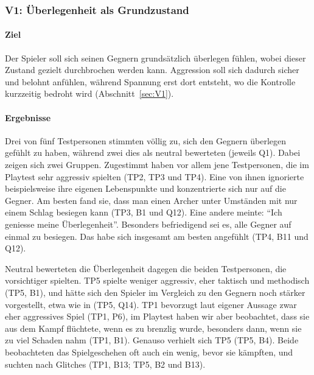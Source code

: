 \documentclass[../Main.tex]{subfiles}
\begin{document}
\subsubsection{V1: Überlegenheit als Grundzustand}

\paragraph{Ziel}
Der Spieler soll sich seinen Gegnern grundsätzlich überlegen fühlen, wobei dieser Zustand gezielt durchbrochen werden kann. Aggression soll sich dadurch sicher und belohnt anfühlen, während Spannung erst dort entsteht, wo die Kontrolle kurzzeitig bedroht wird (Abschnitt~\ref{sec:V1}).

\paragraph{Ergebnisse}
Drei von fünf Testpersonen stimmten völlig zu, sich den Gegnern überlegen gefühlt zu haben, während zwei dies als neutral bewerteten (jeweils Q1). Dabei zeigen sich zwei Gruppen. Zugestimmt haben vor allem jene Testpersonen, die im Playtest sehr aggressiv spielten (TP2, TP3 und TP4). Eine von ihnen ignorierte beispielsweise ihre eigenen Lebenspunkte und konzentrierte sich nur auf die Gegner. Am besten fand sie, dass man einen Archer unter Umständen mit nur einem Schlag besiegen kann (TP3, B1 und Q12). Eine andere meinte: \enquote{Ich geniesse meine Überlegenheit}. Besonders befriedigend sei es, alle Gegner auf einmal zu besiegen. Das habe sich insgesamt am besten angefühlt (TP4, B11 und Q12).

Neutral bewerteten die Überlegenheit dagegen die beiden Testpersonen, die vorsichtiger spielten. TP5 spielte weniger aggressiv, eher taktisch und methodisch (TP5, B1), und hätte sich den Spieler im Vergleich zu den Gegnern noch stärker vorgestellt, etwa wie in \autocite{omegaforce_hyrulewarriors_2014} (TP5, Q14). TP1 bevorzugt laut eigener Aussage zwar eher aggressives Spiel (TP1, P6), im Playtest haben wir aber beobachtet, dass sie aus dem Kampf flüchtete, wenn es zu brenzlig wurde, besonders dann, wenn sie zu viel Schaden nahm (TP1, B1). Genauso verhielt sich TP5 (TP5, B4). Beide beobachteten das Spielgeschehen oft auch ein wenig, bevor sie kämpften, und suchten nach Glitches (TP1, B13; TP5, B2 und B13).
\end{document}
